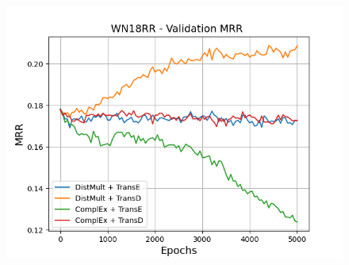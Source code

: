 \begin{figure}
\begin{minipage}{.3\textwidth}
    \end{minipage}
    \begin{minipage}{.3\textwidth}
      \centering
      \includegraphics[width=\linewidth]{figures/results/gan_train/pretrained/uncertainty/max/entropy/wn18rr/5k_epochs/uncertainty_wn18rr_mrrs.png}
    \end{minipage}%
    

\end{figure}
